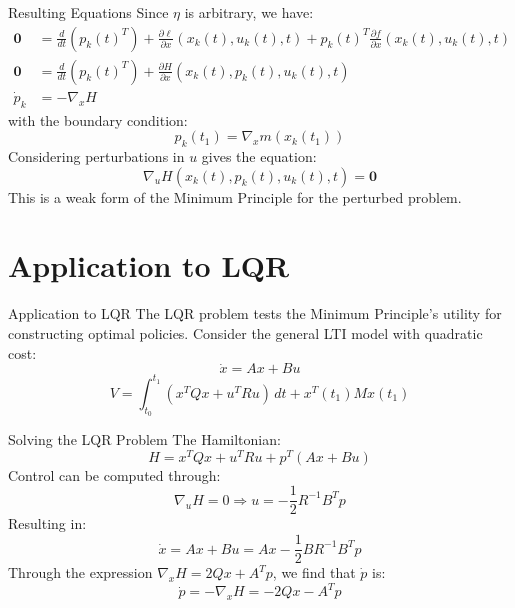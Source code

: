 \documentclass[10pt]{beamer}
\begin{document}
\begin{frame}[fragile]{Resulting Equations}
  Since \( \eta \) is arbitrary, we have:
  \[
    \begin{aligned}
      \mathbf{0} &= \frac{d}{dt} \left( p_k(t)^T \right) + \frac{\partial \ell}{\partial x} (x_k(t), u_k(t), t) + p_k(t)^T \frac{\partial f}{\partial x} (x_k(t), u_k(t), t) \\
      \mathbf{0} &= \frac{d}{dt} \left( p_k(t)^T \right) + \frac{\partial H}{\partial x} (x_k(t), p_k(t), u_k(t), t) \\
      \dot{p}_{k} &= -\nabla_x H
    \end{aligned}
  \]
  with the boundary condition:
  \[
    p_k(t_1) = \nabla_x m(x_k(t_1))
  \]
  Considering perturbations in \( u \) gives the equation:
  \[
    \nabla_u H (x_k(t), p_k(t), u_k(t), t) = \mathbf{0}
  \]
  This is a weak form of the Minimum Principle for the perturbed problem.
\end{frame}

\section{Application to LQR}
  
\begin{frame}[fragile]{Application to LQR}
  The LQR problem tests the Minimum Principle's utility for constructing optimal policies. Consider the general LTI model with quadratic cost:
  \[
  \dot{x} = Ax + Bu
  \]
  \[
  V = \int_{t_0}^{t_1} (x^T Q x + u^T R u) \, dt + x^T(t_1) M x(t_1)
  \]
\end{frame}

\begin{frame}[fragile]{Solving the LQR Problem}
  The Hamiltonian:
  \[
  H = x^T Q x + u^T R u + p^T (Ax + Bu)
  \]
  Control can be computed through:
  \[
  \nabla_u H = 0 \Rightarrow u = -\frac{1}{2} R^{-1} B^T p
  \]
  Resulting in:
  \[
  \dot{x} = Ax + Bu = Ax - \frac{1}{2} BR^{-1} B^T p
  \]
  Through the expression \( \nabla_x H = 2Qx + A^T p \), we find that \( \dot{p} \) is:
  \[
  \dot{p} = -\nabla_x H = -2Q x - A^T p
  \]
\end{frame}
  
\end{document}

